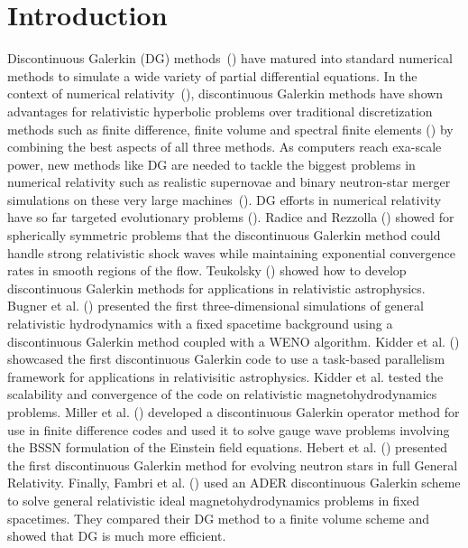 \section{Introduction}
%
Discontinuous Galerkin (DG) methods~(\citet*{Reed.W;Hill.T1973,hesthaven2008nodal, Cock01,cockburn1998runge,Cockburn.B;Karniadakis.G;Shu.C2000})
have matured into standard numerical methods  to simulate a wide
variety of partial differential equations. In the context of numerical
relativity~(\citet*{baumgarte2010numerical}), discontinuous Galerkin
methods have shown advantages for relativistic hyperbolic problems
over traditional discretization methods such as finite difference, finite volume and
spectral finite elements
(\citet*{Field:2010mn,brown2012numerical,field2009discontinuous,zumbusch2009,Radice:2011qr,mocz:14,zanotti:14,endeve:15,teukolsky2015,Bugner:2015gqa,schaal2015astrophysicalfixed,zanotti2015,Miller:2016vik,kidder:16,fambri2018}) by combining the best aspects of all three methods. As computers reach exa-scale power, new methods like DG are needed to tackle the biggest problems in numerical relativity such as realistic supernovae and binary neutron-star merger simulations on these very large machines~(\citet*{kidder:16}).
%
DG efforts in numerical relativity have so far
targeted evolutionary problems (\citet*{Field:2010mn,brown2012numerical,field2009discontinuous,zumbusch2009,Radice:2011qr,teukolsky2015,Bugner:2015gqa,schaal2015astrophysicalfixed,zanotti2015,Miller:2016vik,fambri2018}). Radice and Rezzolla (\citet*{Radice:2011qr}) showed for spherically symmetric problems that the discontinuous Galerkin method could handle strong relativistic shock waves while maintaining exponential convergence rates in smooth regions of the flow. Teukolsky (\citet*{teukolsky2015}) showed how to develop discontinuous Galerkin methods for applications in relativistic astrophysics. Bugner et al. (\citet*{Bugner:2015gqa}) presented the first three-dimensional simulations of general relativistic hydrodynamics with a fixed spacetime background using a discontinuous Galerkin method coupled with a WENO algorithm. Kidder et al. (\citet*{kidder:16}) showcased the first discontinuous Galerkin code to use a task-based parallelism framework for applications in relativisitic astrophysics. Kidder et al. tested the scalability and convergence of the code on relativistic magnetohydrodynamics problems. Miller et al. (\citet*{Miller:2016vik}) developed a discontinuous Galerkin operator method for use in finite difference codes and used it to solve gauge wave problems involving the BSSN formulation of the Einstein field equations. Hebert et al. (\citet*{hebert:2018xbk}) presented the first discontinuous Galerkin method for evolving neutron stars in full General Relativity. Finally, Fambri et al. (\citet*{fambri2018}) used an ADER discontinuous Galerkin scheme to solve general relativistic ideal magnetohydrodynamics problems in fixed spacetimes. They compared their DG method to a finite volume scheme and showed that DG is much more efficient.
